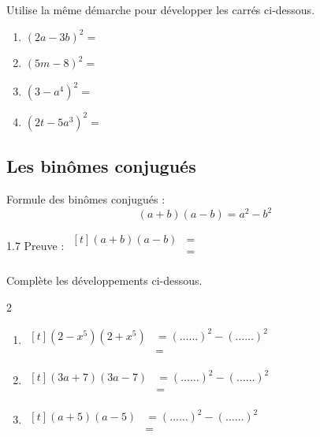 \documentclass[../../syllabus_2.tex]{subfiles}
\begin{document}
\begin{exercise}
  Utilise la même démarche pour développer les carrés ci-dessous.
  \begin{enumerate}[cols=2, itemsep=2cm]
    \item $\left(2a-3b\right)^2=$
    \item $\left(5m-8\right)^2=$
    \item $\left(3-a^4\right)^2=$
    \item $\left(2t - 5a^3\right)^2=$
  \end{enumerate}
\end{exercise}

\newpage
\subsection{Les binômes conjugués}

Formule des binômes conjugués :
\begin{equation*}
  \left(a+b\right)\left(a-b\right)=a^2-b^2
\end{equation*}

\begin{spacing}{1.7}
  Preuve : $
    \begin{aligned}[t]
      \left(a+b\right)\left(a-b\right)
       & = \\
       & = \\
    \end{aligned}
  $
\end{spacing}

\begin{exercise}
  Complète les développements ci-dessous.
  \begin{spacing}{2}
    \begin{enumerate}[itemsep=0.5cm]
      \item $
              \begin{aligned}[t]
                \left(2-x^5\right)\left(2+x^5\right)
                 & = \left( \ldots \ldots \right)^2 - \left( \ldots \ldots \right)^2 \\
                 & =
              \end{aligned}
            $
      \item $
              \begin{aligned}[t]
                \left(3a+7\right)\left(3a-7\right)
                 & = \left( \ldots \ldots \right)^2 - \left( \ldots \ldots \right)^2 \\
                 & =
              \end{aligned}
            $
      \item $
              \begin{aligned}[t]
                \left(a+5\right)\left(a-5\right)
                 & = \left( \ldots \ldots \right)^2 - \left( \ldots \ldots \right)^2 \\
                 & =
              \end{aligned}
            $
    \end{enumerate}
  \end{spacing}
\end{exercise}
\end{document}
